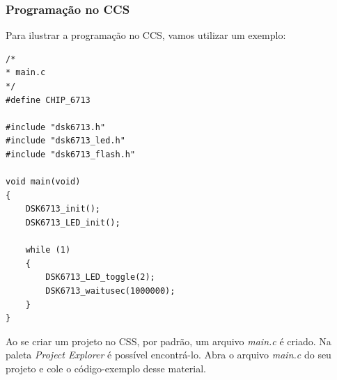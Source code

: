 \documentclass[a4paper, 12pt]{article}
\begin{document}
\subsubsection{Programação no CCS}

Para ilustrar a programação no CCS, vamos utilizar um exemplo:

\newcommand{\estiloJava}{
	}
	
\estiloJava
\begin{lstlisting}
/*
* main.c
*/
#define CHIP_6713

#include "dsk6713.h"
#include "dsk6713_led.h"
#include "dsk6713_flash.h"

void main(void)
{
	DSK6713_init();
	DSK6713_LED_init();

	while (1)
	{
		DSK6713_LED_toggle(2);
		DSK6713_waitusec(1000000);
	}
}
\end{lstlisting}


Ao se criar um projeto no CSS, por padrão, um arquivo \textit{main.c} é criado. Na paleta \textit{Project Explorer} é possível encontrá-lo. Abra o arquivo \textit{main.c} do seu projeto e cole o código-exemplo desse material.
\end{document}
